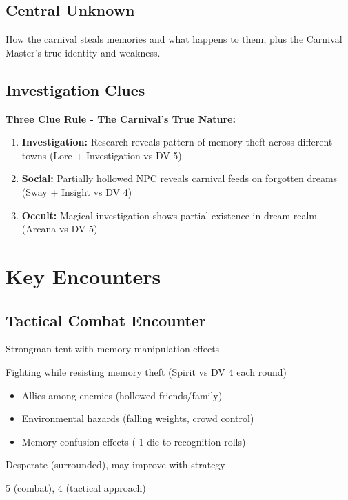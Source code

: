 \documentclass[11pt]{article}
\newenvironment{encounter}[1]{\begin{description}[leftmargin=*,style=standard]\item[\textbf{#1}]}{\end{description}}
\begin{document}
\subsection{Central Unknown}
How the carnival steals memories and what happens to them, plus the Carnival Master's true identity and weakness.

\subsection{Investigation Clues}
\textbf{Three Clue Rule - The Carnival's True Nature:}
\begin{enumerate}
\item \textbf{Investigation:} Research reveals pattern of memory-theft across different towns (Lore + Investigation vs DV 5)
\item \textbf{Social:} Partially hollowed NPC reveals carnival feeds on forgotten dreams (Sway + Insight vs DV 4)
\item \textbf{Occult:} Magical investigation shows partial existence in dream realm (Arcana vs DV 5)
\end{enumerate}

\section{Key Encounters}

\subsection{Tactical Combat Encounter}
\begin{encounter}{Battle with Bull Carson and Hollowed Townsfolk}
\item[Location:] Strongman tent with memory manipulation effects
\item[Challenge:] Fighting while resisting memory theft (Spirit vs DV 4 each round)
\item[Complications:] 
  \begin{itemize}
    \item Allies among enemies (hollowed friends/family)
    \item Environmental hazards (falling weights, crowd control)
    \item Memory confusion effects (-1 die to recognition rolls)
  \end{itemize}
\item[Position:] Desperate (surrounded), may improve with strategy
\item[DV:] 5 (combat), 4 (tactical approach)
\end{encounter}
\end{document}
